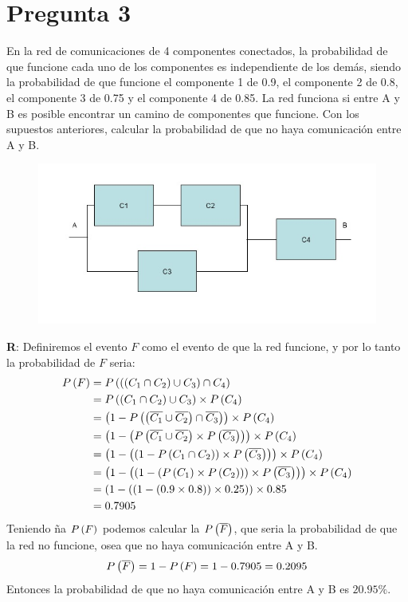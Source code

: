 
\section*{Pregunta 3}
En la red de comunicaciones de 4 componentes conectados, la probabilidad de que funcione cada uno de los componentes es independiente de los demás, siendo la probabilidad de que funcione el componente 1 de 0.9, el componente 2 de 0.8, el componente 3 de 0.75 y el componente 4 de 0.85. La red funciona si entre A y B es posible encontrar un camino de componentes que funcione. Con los supuestos anteriores, calcular la probabilidad de que no haya comunicación entre A y B.

\begin{figure}[H]
	\centering
	\includegraphics[scale=0.65]{img/ejercicio3.jpg}
\end{figure}

\textbf{R}: Definiremos el evento $F$ como el evento de que la red funcione, y por lo tanto la probabilidad de $F$ seria:
\begin{align*}
	{P} \left( {F} \right) 
	& = {P} \left( { \left( \left( C_1 \cap C_2 \right) \cup C_3 \right) \cap C_4 } \right) \\
	& = {P} \left( { \left( C_1 \cap C_2 \right) \cup C_3 } \right) \times {P} \left( {C_4} \right) \\
	& = \left( 1 - {P} \left( { \left( \overline{C_1} \cup \overline{C_2} \right) \cap \overline{C_3} } \right) \right)  \times {P} \left( {C_4} \right) \\
	& = \left( 1 - \left( {P} \left( { \overline{C_1} \cup \overline{C_2} } \right) \times {P} \left( {\overline{C_3}} \right) \right) \right)  \times {P} \left( {C_4} \right) \\
	& = \left( 1 - \left( \left( 1 - {P} \left( {C_1 \cap C_2} \right) \right) \times {P} \left( {\overline{C_3}} \right) \right) \right) \times {P} \left( {C_4} \right) \\
	& = \left( 1 - \left( \left( 1 - \left( {P} \left( {C_1} \right) \times {P} \left( {C_2} \right) \right)  \right) \times {P} \left( {\overline{C_3}} \right) \right) \right) \times {P} \left( {C_4} \right) \\
	& = \left( 1 - \left( \left( 1 - \left( 0.9 \times 0.8 \right)  \right) \times 0.25 \right) \right) \times 0.85 \\
	& = 0.7905
\end{align*}
Teniendo ña ${P} \left( {F} \right)$ podemos calcular la ${P} \left( {\overline{F}} \right)$, que seria la probabilidad de que la red no funcione, osea que no haya comunicación entre A y B.
\begin{align*}
	{P} \left( {\overline{F}} \right) = 1 - {P} \left( {F} \right) = 1 - 0.7905 = 0.2095
\end{align*}
Entonces la probabilidad de que no haya comunicación entre A y B es $20.95\%$.

